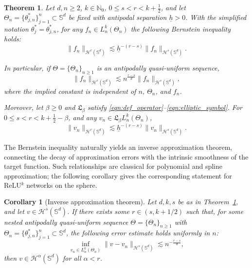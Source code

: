 \documentclass{article}
\numberwithin{equation}{section}
\newtheorem{theorem}{Theorem}
\newtheorem{corollary}{Corollary}
\def\NN{\mathbb{N}}
\def\SS{\mathbb{S}}
\begin{document}
\begin{theorem}\label{thm:inverse}
    Let $d,n\geq2$, $k\in\NN_0$, $0\leq s<r< k+\frac{1}{2}$, and let $\Theta_n=\{\theta_{j,n}^*\}_{j=1}^n\subset\SS^d$ be fixed with antipodal separation $\underline h>0$. With the simplified notation $\theta_j^*=\theta_{j,n}^*$, for any $f_n\in L_n^k(\Theta_n)$ the following Bernstein inequality holds:
    \begin{equation}
        \|f_n\|_{\mathcal{H}^r(\SS^d)}\lesssim \underline{h}^{-(r-s)}\|f_n\|_{\mathcal{H}^s(\SS^d)}.
    \end{equation}
    
    In particular, if $\Theta=\{\Theta_n\}_{n\ge1}$ is an antipodally quasi-uniform sequence,
    \begin{equation}
        \|f_n\|_{\mathcal{H}^r(\SS^d)}\lesssim n^{\frac{r-s}{d}}\|f_n\|_{\mathcal{H}^s(\SS^d)},
    \end{equation}
    where the implied constant is independent of $n$, $\Theta_n$, and $f_n$.

    Moreover, let $\beta\geq0$ and $\mathfrak L_\beta$ satisfy \eqref{eqn:def_operator}--\eqref{eqn:elliptic_symbol}. For $0\leq s<r< k+\frac{1}{2}-\beta$, and any $v_n\in\mathfrak{L}_\beta L_n^k(\Theta_n)$,
    \begin{equation}\label{eqn:residual_bernstein}
\|v_n\|_{\mathcal H^r(\SS^d)}\lesssim\underline h^{-(r-s)}\|v_n\|_{\mathcal H^s(\SS^d)}.
\end{equation}

\end{theorem}


The Bernstein inequality naturally yields an inverse approximation theorem, connecting the decay of approximation errors with the intrinsic smoothness of the target function. Such relationships are classical for polynomial and spline approximation; the following corollary gives the corresponding statement for ReLU$^k$ networks on the sphere.

\begin{corollary}[Inverse approximation theorem]
Let $d,k,s$ be as in Theorem~\ref{thm:inverse}, and let $v\in\mathcal H^s(\SS^d)$. If there exists some $r\in(s,k+1/2)$ such that, for some nested antipodally quasi-uniform sequence $\Theta=\{\Theta_n\}_{n\ge1}$ with $\Theta_n=\{\theta_{j,n}^*\}_{j=1}^n\subset\SS^d$, the following error estimate holds uniformly in $n$:
\begin{equation}\label{eqn_decay_inv_appr}
\inf\limits_{v_n\in L_n^k(\Theta_n)}\|v-v_n\|_{\mathcal H^s(\SS^d)}\lesssim n^{-\frac{r-s}{d}},
\end{equation}
then $v\in\mathcal H^\alpha(\SS^d)$ for all $\alpha<r$.
\end{corollary}
\end{document}
